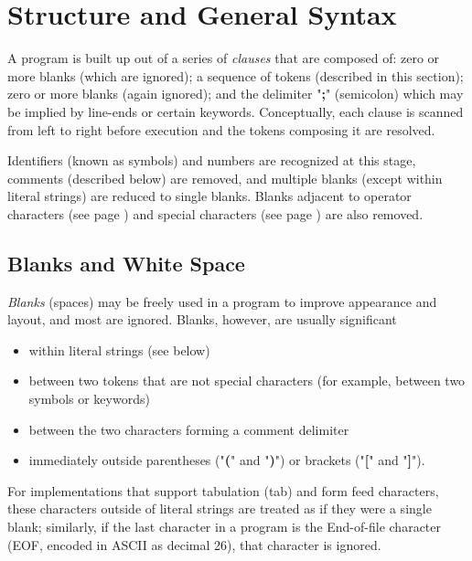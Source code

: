 \section{Structure and General Syntax}\label{refclau}
\index{,}
 A \nr{} program is built up out of a series of \emph{clauses} that
are composed of: zero or more blanks (which are ignored); a sequence of
tokens (described in this section); zero or more blanks (again
ignored); and the delimiter "\textbf{;}" (semicolon) which may
be implied by line-ends or certain keywords.
Conceptually, each clause is scanned from left to right before
execution and the tokens composing it are resolved.
 
Identifiers (known as symbols) and numbers are recognized at this stage,
comments (described below) are removed, and multiple blanks (except
within literal strings) are reduced to single blanks.
Blanks adjacent to  operator characters (see page \pageref{refopers})  and
 special characters (see page \pageref{refspecs})  are also removed.
\subsection{Blanks and White Space}\label{refblank}
 \emph{Blanks} (spaces) may be freely used in a program to
improve appearance and layout, and most are ignored.
Blanks, however, are usually significant
\begin{itemize}
\item within literal strings (see below)
\item between two tokens that are not special characters (for example,
between two symbols or keywords)
\item between the two characters forming a comment delimiter
\item immediately outside parentheses ("\textbf{(}" and
"\textbf{)}") or brackets ("\textbf{[}" and
"\textbf{]}").
\end{itemize}
 
For implementations that support tabulation (tab) and form feed
characters, these characters outside of literal strings are treated as
if they were a single blank; similarly, if the last character in a
\nr{} program is the End-of-file character (EOF, encoded in ASCII as
decimal 26), that character is ignored.
